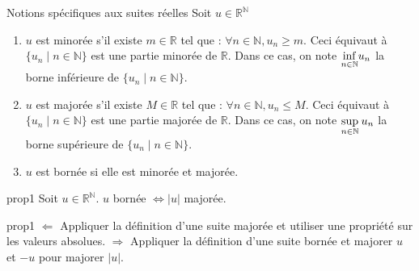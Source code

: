 \documentclass[12pt,a4paper]{report}
\begin{document}
\begin{definition}{Notions spécifiques aux suites réelles}{}
Soit $u \in \mathbb{R}^\mathbb{N}$
\begin{enumerate}

\item $u$ est minorée s'il existe $m \in \mathbb{R}$ tel que : $\forall n \in \mathbb{N}, u_n \geq m$. \newline Ceci équivaut à $\{u_n \mid n \in \mathbb{N} \}$ est une partie minorée de $\mathbb{R}$. Dans ce cas, on note $\underset{n \in \mathbb{N}}{\rm{inf}} u_n$ la borne inférieure de $\{u_n \mid n \in \mathbb{N} \}$.

\item $u$ est majorée s'il existe $M \in \mathbb{R}$ tel que : $\forall n \in \mathbb{N}, u_n \leq M$. \newline Ceci équivaut à $\{u_n \mid n \in \mathbb{N} \}$ est une partie majorée de $\mathbb{R}$. Dans ce cas, on note $\underset{n \in \mathbb{N}}{\rm{sup }} \: u_n$ la borne supérieure de $\{u_n \mid n \in \mathbb{N} \}$.
\item $u$ est bornée si elle est minorée et majorée.
\end{enumerate}
\end{definition}

\begin{proposition}{}{prop1}
Soit $u \in \mathbb{R}^\mathbb{N}$. $u$ bornée $\Longleftrightarrow \lvert u \rvert$ majorée.
\end{proposition}

\begin{principedemo}{prop1}
$\Longleftarrow$ Appliquer la définition d'une suite majorée et utiliser une propriété sur les valeurs absolues.
\newline $\Longrightarrow$ Appliquer la définition d'une suite bornée et majorer $u$ et $-u$ pour majorer $\lvert u \rvert$.
\end{principedemo}
\end{document}
